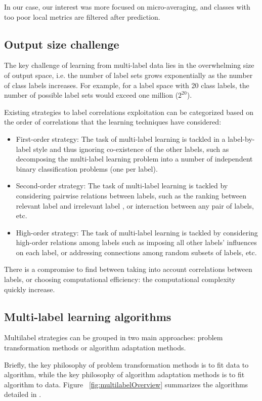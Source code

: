 In our case, our interest was more focused on micro-averaging, and classes with too poor local metrics are filtered after prediction.

\subsection{Output size challenge}

The key challenge of learning from multi-label data lies in the overwhelming size of output space, i.e. the number of label sets grows exponentially as the number of class labels increases. For example, for a label space with 20 class labels, the number of possible label sets would exceed one million ($2^{20}$).

Existing strategies to label correlations exploitation can be categorized based on the order of correlations that the learning techniques have considered:
\begin{itemize}
	\item First-order strategy: The task of multi-label learning is tackled in a label-by-label style and thus ignoring co-existence of the other labels, such as decomposing the multi-label learning problem into a number of independent binary classification problems (one per label). 
	\item Second-order strategy: The task of multi-label learning is tackled by considering pairwise relations between labels, such as the ranking between relevant label and irrelevant label , or interaction between any pair of labels, etc.
	\item High-order strategy: The task of multi-label learning is tackled by considering high-order relations among labels such as imposing all other labels’ influences on each label, or addressing connections among random subsets of labels, etc.
\end{itemize}

There is a compromise to find between taking into account correlations between labels, or choosing computational efficiency: the computational complexity quickly increase.

\subsection{Multi-label learning algorithms}

Multilabel strategies can be grouped in two main approaches: problem transformation methods or algorithm adaptation methods.

Briefly, the key philosophy of problem transformation methods is to fit data to algorithm,
while the key philosophy of algorithm adaptation methods is to fit algorithm to data. Figure ~\ref{fig:multilabelOverview}
summarizes the algorithms detailed in \cite[Zhang and Zhou paper]{MultilabelReview}.

